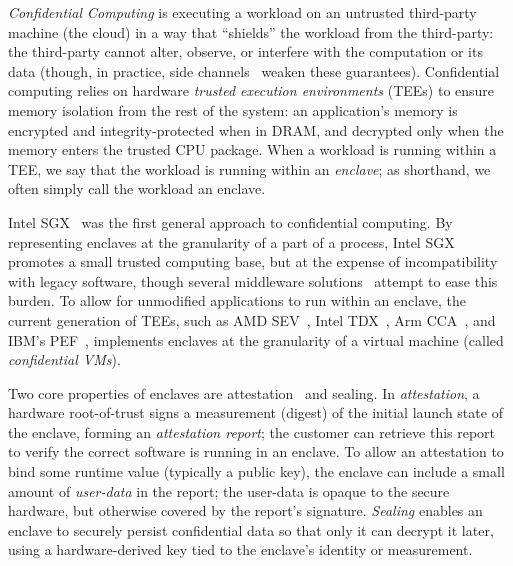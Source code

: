 %
\emph{Confidential Computing} is executing a workload on an untrusted
third-party machine (the cloud) in a way that ``shields'' the workload from the
third-party: the third-party cannot alter, observe, or interfere with the
computation or its data (though, in practice, side channels~\cite{
    18-sec-foreshadow,
    19-sec-unprotected_io_in_sev,
    20-oakland-lvi,
    21-ccs-one_glitch,
    21-sec-cipherleaks,
    22-dissertation-amd_sev_flaws,
    22-sec-aepic_leak}
weaken these guarantees).
%
Confidential computing relies on hardware \emph{trusted execution environments} (TEEs) to
ensure memory isolation from the rest of the system: an application's memory is
encrypted and integrity-protected when in DRAM, and decrypted only when the
memory enters the trusted CPU package.
%
When a workload is running within a TEE, we say that the workload is running
within an \emph{enclave}; as shorthand, we often simply call the workload
an enclave.


%
Intel SGX~\cite{intel_sgx_programming_reference,13-hasp-innovative_instructions}
was the first general approach to confidential computing.
%
By representing enclaves at the granularity of a part of a process, Intel SGX
promotes a small trusted computing base, but at the expense of
incompatibility with legacy software, though several middleware solutions~\cite{ 
14-osdi-haven, 16-osdi-scone, 17-atc-graphene, 20-sec-conclaves} attempt to
ease this burden.
%
To allow for unmodified applications to run within an enclave, the current
generation of TEEs, such as AMD
SEV~\cite{amd-memory_encryption,amd-sev_es,amd-sev_snp}, Intel
TDX~\cite{intel_tdx}, Arm CCA~\cite{introducing_arm_cca}, and IBM's
PEF~\cite{21-eurosys-openpower}, implements
enclaves at the granularity of a virtual machine (called \emph{confidential
VMs}).


%
Two core properties of enclaves are
attestation~\cite{13-hasp-innovative_attestation} and sealing.
%
In \emph{attestation}, a hardware root-of-trust signs a measurement (digest)
of the initial launch state of the enclave, forming an \emph{attestation
report}; the customer can retrieve this report to verify the correct
software is running in an enclave.
%
To allow an attestation to bind some runtime value (typically a public
key), the enclave can include a small amount of \emph{user-data} in the
report; the user-data is opaque to the secure hardware, but otherwise covered
by the report's signature.
%
\emph{Sealing} enables an enclave to securely persist confidential data so that
only it can decrypt it later, using a hardware-derived key tied to the
enclave's identity or measurement.


